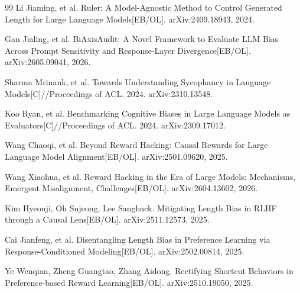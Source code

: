 \documentclass[9pt,a4paper,fontset=windows]{ctexart}
\theoremstyle{definition}
\numberwithin{equation}{section}
\begin{document}
\begin{thebibliography}{99}
 Li Jiaming, et al. Ruler: A Model-Agnostic Method to Control Generated Length for Large Language Models[EB/OL]. arXiv:2409.18943, 2024.

 Gan Jialing, et al. BiAxisAudit: A Novel Framework to Evaluate LLM Bias Across Prompt Sensitivity and Response-Layer Divergence[EB/OL]. arXiv:2605.09041, 2026.

 Sharma Mrinank, et al. Towards Understanding Sycophancy in Language Models[C]//Proceedings of ACL. 2024. arXiv:2310.13548.

 Koo Ryan, et al. Benchmarking Cognitive Biases in Large Language Models as Evaluators[C]//Proceedings of ACL. 2024. arXiv:2309.17012.

 Wang Chaoqi, et al. Beyond Reward Hacking: Causal Rewards for Large Language Model Alignment[EB/OL]. arXiv:2501.09620, 2025.

 Wang Xiaohua, et al. Reward Hacking in the Era of Large Models: Mechanisms, Emergent Misalignment, Challenges[EB/OL]. arXiv:2604.13602, 2026.

 Kim Hyeonji, Oh Sujeong, Lee Sanghack. Mitigating Length Bias in RLHF through a Causal Lens[EB/OL]. arXiv:2511.12573, 2025.

 Cai Jianfeng, et al. Disentangling Length Bias in Preference Learning via Response-Conditioned Modeling[EB/OL]. arXiv:2502.00814, 2025.

 Ye Wenqian, Zheng Guangtao, Zhang Aidong. Rectifying Shortcut Behaviors in Preference-based Reward Learning[EB/OL]. arXiv:2510.19050, 2025.

\end{thebibliography}
\end{document}
